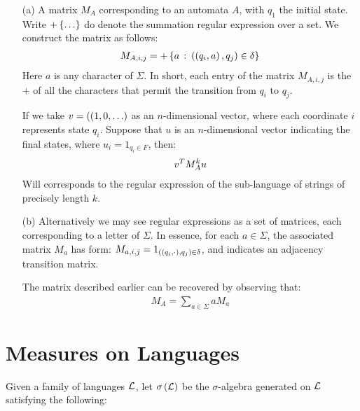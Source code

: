 \documentclass[12pt]{article}
\begin{document}
\begin{enumerate}
    \begin{enumerate}
      \item[(a)]
        A matrix \(M_A\) corresponding to an automata \(A\),
        with \(q_1\) the initial state.
        Write \(+\left\{\ldots\right\}\) do denote
        the summation regular expression over a set.
        We construct the matrix as follows:
        \begin{align*}
          M_{A, i, j} =
            + \left\{a \ \colon \left(\left(q_i, a\right), q_j\right) \in \delta\right\}
        \end{align*}
        Here \(a\) is any character of \(\Sigma\).
        In short, each entry of the matrix \(M_{A, i, j}\)
        is the \(+\) of all the characters
        that permit the transition from \(q_i\) to \(q_j\).

        If we take \(v = (\left(1, 0, \ldots\right)\) as an \(n\)-dimensional
        vector, where each coordinate \(i\) represents state \(q_i\).
        Suppose that \(u\) is an \(n\)-dimensional vector indicating
        the final states,
        where \(u_i = 1_{q_i \in F}\), then:
        \begin{align*}
          {v}^{T} M_A ^k u
        \end{align*}
        Will corresponds to the regular expression of the sub-language
        of strings of precisely length \(k\).

      \item[(b)]
        Alternatively we may see regular expressions as a
        set of matrices, each corresponding to a letter of \(\Sigma\).
        In essence, for each \(a \in \Sigma\), the associated
        matrix \(M_a\) has form:
        \(M_{a, i, j} = 1_{\left(\left(q_i, \cdot\right), q_j\right) \in \delta}\),
        and indicates an adjacency transition matrix.

        The matrix described earlier can be recovered by observing that:
        \begin{align*}
          M_{A} = \sum_{a \in \Sigma} a M_{a}
        \end{align*}

    \end{enumerate}

\end{enumerate}

\section{Measures on Languages}
Given a family of languages \(\mathcal{L}\),
let \(\sigma\left(\mathcal{L}\right)\) be the \(\sigma\)-algebra generated on
\(\mathcal{L}\) satisfying the following:
\end{document}
